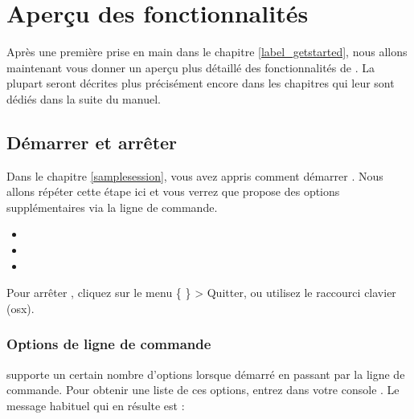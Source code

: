 \chapter{Aperçu des fonctionnalités} \label{feature_glance}

Après une première prise en main dans le chapitre \ref{label_getstarted}, nous 
allons maintenant vous donner un aperçu plus détaillé des fonctionnalités de 
\qg. La plupart seront décrites plus précisément encore dans les chapitres qui 
leur sont dédiés dans la suite du manuel.

\section{Démarrer et arrêter \qg} \label{label_starting}

Dans le chapitre \ref{samplesession}, vous avez appris comment démarrer \qg. 
Nous allons répéter cette étape ici et vous verrez que \qg propose des options 
supplémentaires via la ligne de commande.

\begin{itemize}[label=--]
\item {} 
\item {}
\item {}
\end{itemize} 

Pour arrêter \qg, cliquez sur le menu \{\nix{}   \} > 
Quitter, ou utilisez le raccourci clavier  (osx{}).

\subsection{Options de ligne de commande} 
\label{label_commandline}

\nix \qg supporte un certain nombre d'options lorsque démarré en passant par 
la ligne de commande. Pour obtenir une liste de ces options, entrez dans votre 
console . Le message habituel qui en résulte est :

